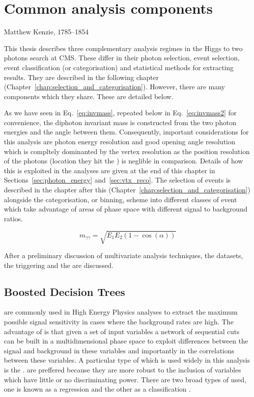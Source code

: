 \chapter{Common analysis components}
\label{chap:common_analysis_components}
{Matthew Kenzie, 1785--1854}

This thesis describes three complementary analysis regimes in the Higgs to two photons search at CMS. These differ in their photon selection, event selection, event classification (or categorisation) and statistical methods for extracting results. They are described in the following chapter (Chapter~\ref{chap:selection_and_categorisation}). However, there are many components which they share. These are detailed below.

As we have seen in Eq.~\ref{eq:invmass}, repeated below in Eq.~\ref{eq:invmass2} for convenience, the diphoton invariant mass is constructed from the two photon energies and the angle between them. Consequently, important considerations for this analysis are photon energy resolution and good opening angle resolution which is compltely dominanted by the vertex resolution as the position resolution of the photons (location they hit the \ECAL) is neglible in comparison. Details of how this is exploited in the analyses are given at the end of this chapter in Sections~\ref{sec:photon_energy} and~\ref{sec:vtx_reco}. The selection of events is described in the chapter after this (Chapter~\ref{chap:selection_and_categorisation}) alongside the categorisation, or binning, scheme into different classes of event which take advantage of areas of phase space with different signal to background ratios.

\begin{equation}
  m_{\gamma\gamma} = \sqrt{E_{1}E_{2}(1-\cos(\alpha))}
  \label{eq:invmass2}
\end{equation}

After a preliminary discussion of multivariate analysis techniques, the datasets, the triggering and the \MC are discussed.

\section{Boosted Decision Trees}
\label{sec:bdts}

\MVAs are commonly used in High Energy Physics analyses to extract the maximum possible signal sensitivity in cases where the background rates are high. The advantage of \MVAs is that given a set of input variables a network of sequential cuts can be built in a multidimensional phase space to exploit differences between the signal and background in these variables and importantly in the correlations between these variables. A particular type of \MVA which is used widely in this analysis is the \BDT. \BDTs are preffered because they are more robust to the inclusion of variables which have little or no discriminating power. There are two broad types of \BDT used, one is known as a regression \BDT and the other as a classification \BDT. 


